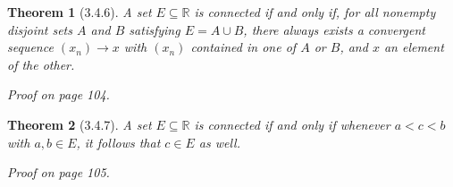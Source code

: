 \documentclass{article}
\newtheorem{theorem}{Theorem}
\begin{document}
\begin{theorem}[3.4.6]
    A set $E \subseteq \mathbb{R}$ is connected if and only if, for all nonempty disjoint sets $A$ and $B$ satisfying $E=A\cup B$, there always exists a convergent sequence $(x_n)\rightarrow x$ with $(x_n)$ contained in one of $A$ or $B$, and $x$ an element of the other.

    Proof on page 104.
\end{theorem}

\begin{theorem}[3.4.7]
    A set $E \subseteq \mathbb{R}$ is connected if and only if whenever $a < c < b$ with $a,b \in E$, it follows that $c \in E$ as well.

    Proof on page 105.
\end{theorem}
\end{document}
